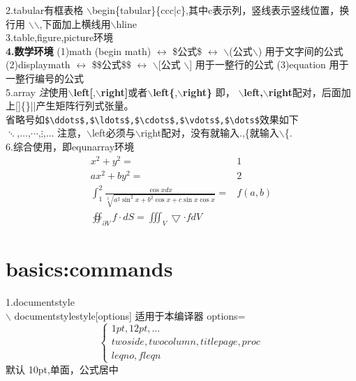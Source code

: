 \documentclass{article}[20pt]{}
\begin{document}
2.tabular有框表格
$\backslash$begin\{tabular\}\{ccc|c\},其中c表示列，竖线表示竖线位置，换行用 $\backslash$$\backslash$,下面加上横线用$\backslash$hline
\\3.table,figure,picture环境
\\{\bf 4.数学环境}
(1)math (begin math) $\longleftrightarrow$ \$公式\$ $\longleftrightarrow$ $\backslash$(公式$\backslash$) 用于文字间的公式
(2)displaymath $\longleftrightarrow$ \$\$公式\$\$ $\longleftrightarrow$ $\backslash$[公式 $\backslash$] 用于一整行的公式
(3)equation 用于一整行编号的公式
\\5.array
{\it 注}使用{\bf$\backslash$left[},{\bf $\backslash$right]}或者{\bf$\backslash$left\{},{\bf $\backslash$right\}}
即，
{\bf $\backslash$left,$\backslash$right}配对，后面加上[]\{\}||产生矩阵行列式张量。\\省略号如\verb|$\ddots$,$\ldots$,$\cdots$,$\vdots$,$\dots$|效果如下\\
$\ddots$,$\ldots$,$\cdots$,$\vdots$,$\dots$
注意，$\backslash$left必须与$\backslash$right配对，没有就输入.,\{就输入$\backslash$\{.
\\6.综合使用，即equnarray环境
\begin{eqnarray}
x^2+y^2=&1\\ 
ax^2+by^2=&2\\ 
\int_{1}^{2}{\frac{\cos 
		{ x}dx}{\sqrt[3]{
			a^2 \sin ^2{ x} 
			+b^2 \cos 
			{x} +c 
			\sin {x}
			 \cos{ x}}}}
		 = & f(a,b)\\
		 \oiint_{\partial V}f\cdot dS=\iiint_V \bigtriangledown\cdot f dV
\end{eqnarray}

\part{basics:commands}
1.documentstyle
\\$\backslash$ documentstyle{style}[options] 适用于本编译器
 options= $$\left\{
\begin{array}{c}
	1pt,12pt,... \\
	twoside,twocolumn,titlepage,proc\\
	leqno,fleqn
\end{array}\right.$$
默认 10pt,单面，公式居中
\end{document}
